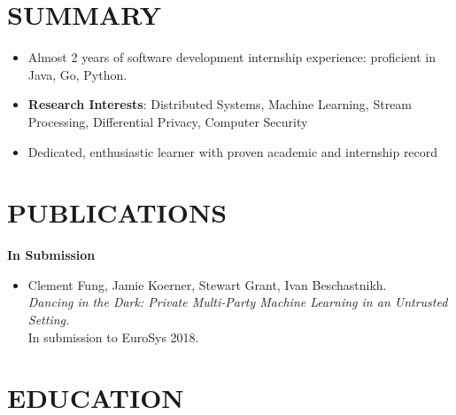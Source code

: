\documentclass[10pt]{res} %
\begin{document}
\begin{resume}


\section{SUMMARY}

\begin{itemize}
    \item Almost 2 years of software development internship experience:
    proficient in Java, Go, Python.
    \item \textbf{Research Interests}: Distributed Systems, Machine
    Learning, Stream Processing, Differential Privacy, Computer Security
    \item Dedicated, enthusiastic learner with proven academic and internship record
\end{itemize}


\section{PUBLICATIONS}

\vspace{0.2in} %

\textbf{In Submission} 
\begin{itemize}
\item Clement Fung, Jamie Koerner, Stewart Grant, Ivan Beschastnikh.
\\
\emph{Dancing in the Dark: Private Multi-Party Machine Learning in an
Untrusted Setting.} \\ 
In submission to EuroSys 2018.
\end{itemize}


\section{EDUCATION} 


\end{resume}
\end{document}
